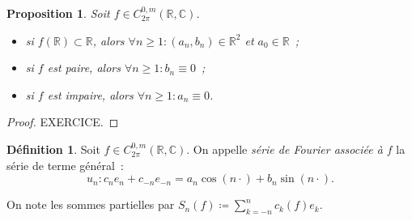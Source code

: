 \documentclass{report}
\newtheorem{prp}[thm]{Proposition}
\theoremstyle{definition}
\newtheorem{déf}[thm]{Définition}
\theoremstyle{remark}
\numberwithin{equation}{section}
\newcommand{\C}{\mathbb C}
\newcommand{\R}{\mathbb R}
\newcommand{\CzmT}[1]{C^{0,m}_{#1}}
\newcommand{\Czm}{\CzmT{2\pi}}
\begin{document}
			\begin{prp} Soit $f \in \Czm(\R, \C)$.
			\begin{itemize}
				\item si $f(\R) \subset \R$, alors $\forall n \geq 1 : (a_n, b_n) \in \R^2$ et $a_0 \in \R$~;
				\item si $f$ est paire, alors $\forall n \geq 1 : b_n \equiv 0$~;
				\item si $f$ est impaire, alors $\forall n \geq 1 : a_n \equiv 0$.
			\end{itemize}
			\end{prp}

			\begin{proof} EXERCICE.
			\end{proof}

			\begin{déf} Soit $f \in \Czm(\R, \C)$. On appelle \textit{série de Fourier associée à $f$} la série de terme général~:
			\begin{equation}
				u_n : c_ne_n + c_{-n}e_{-n} = a_n\cos(n\cdot) + b_n\sin(n\cdot).
			\end{equation}

			On note les sommes partielles par $S_n(f) \coloneqq \sum_{k=-n}^nc_k(f)e_k$.
			\end{déf}

\end{document}
